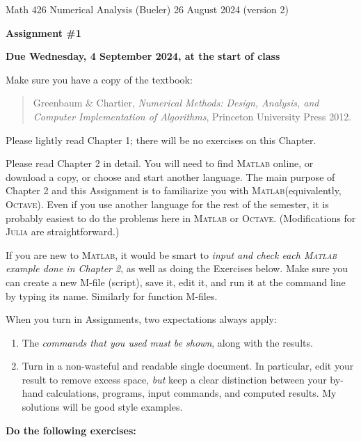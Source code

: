 \documentclass[12pt]{amsart}
\newcommand{\Julia}{\textsc{Julia}\xspace}
\newcommand{\Matlab}{\textsc{Matlab}\xspace}
\newcommand{\Octave}{\textsc{Octave}\xspace}
\begin{document}
\scriptsize \noindent Math 426 Numerical Analysis (Bueler) \hfill 26 August 2024 (version 2)
\normalsize

\medskip\bigskip

\Large\centerline{\textbf{Assignment \#1}}
\large
\bigskip

\centerline{\textbf{Due Wednesday, 4 September 2024, at the start of class}}
\bigskip
\normalsize

\thispagestyle{empty}

\bigskip
\noindent Make sure you have a copy of the textbook:

\begin{quote}
Greenbaum \& Chartier, \emph{Numerical Methods: Design, Analysis, and Computer Implementation of Algorithms}, Princeton University Press 2012.
\end{quote}

\bigskip
\noindent Please lightly read Chapter 1; there will be no exercises on this Chapter.

\bigskip
\noindent Please read Chapter 2 in detail.  You will need to find \Matlab online, or download a copy, or choose and start another language.  The main purpose of Chapter 2 and this Assignment is to familiarize you with \Matlab (equivalently, \Octave).  Even if you use another language for the rest of the semester, it is probably easiest to do the problems here in \Matlab or \Octave.  (Modifications for \Julia are straightforward.)

\bigskip
\noindent If you are new to \Matlab, it would be smart to \emph{input and check each \Matlab example done in Chapter 2}, as well as doing the Exercises below.  Make sure you can create a new M-file (script), save it, edit it, and run it at the command line by typing its name.  Similarly for function M-files.

\bigskip
\noindent When you turn in Assignments, two expectations always apply:
\renewcommand{\labelenumi}{\arabic{enumi}.\,}
\begin{enumerate}
\item The \emph{commands that you used must be shown}, along with the results.
\item Turn in a non-wasteful and readable single document.  In particular, edit your result to remove excess space, \emph{but} keep a clear distinction between your by-hand calculations, programs, input commands, and computed results.  My solutions will be good style examples.
\end{enumerate}

\bigskip\bigskip
\noindent \textbf{Do the following exercises:}
\end{document}
